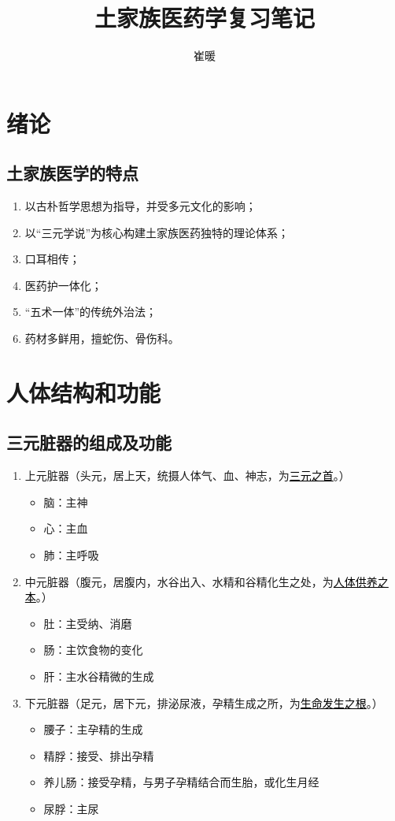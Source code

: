 \documentclass[cn,black,12pt,normal,founder]{elegantnote}
\title{土家族医药学复习笔记}
\author{崔暖}
\date{\zhtoday}
\newcommand{\redt}[1]{\textcolor{black}{{}#1}}      %
\begin{document}
\maketitle

\section{绪论}

\subsection{土家族医学的特点}

\begin{enumerate}
  \item 以古朴哲学思想为指导，并受多元文化的影响；
  \item 以“三元学说”为核心构建土家族医药独特的理论体系；
  \item 口耳相传；
  \item 医药护一体化；
  \item “五术一体”的传统外治法；
  \item 药材多鲜用，擅蛇伤、骨伤科。
\end{enumerate}

\section{人体结构和功能}

\subsection{三元脏器的组成及功能}

\begin{enumerate}
  \item 上元脏器（头元，居上天，统摄人体气、血、神志，为\redt{\uline{三元之首}}。）
  \begin{itemize}
    \item 脑：主神
    \item 心：主血
    \item 肺：主呼吸
  \end{itemize}
  \item 中元脏器（腹元，居腹内，水谷出入、水精和谷精化生之处，为\redt{\uline{人体供养之本}}。）
  \begin{itemize}
    \item 肚：主受纳、消磨
    \item 肠：主饮食物的变化
    \item 肝：主水谷精微的生成
  \end{itemize}
  \item 下元脏器（足元，居下元，排泌尿液，孕精生成之所，为\redt{\uline{生命发生之根}}。）
  \begin{itemize}
    \item 腰子：主孕精的生成
    \item 精脬：接受、排出孕精
    \item 养儿肠：接受孕精，与男子孕精结合而生胎，或化生月经
    \item 尿脬：主尿
  \end{itemize}
\end{enumerate}
\end{document}
